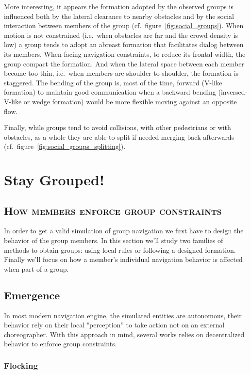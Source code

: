 \documentclass[a4paper,titlepage]{article}
\newcommand{\sectionsubtitle}[1]{{\subsection*{\scshape #1}}}
\begin{document}
More interesting, it appears the formation adopted by the observed groups is influenced both by the lateral clearance to nearby obstacles and by the social interaction between members of the group (cf.\ figure~\ref{fig:social_groups}). When motion is not constrained (i.e.\ when obstacles are far and the crowd density is low) a group tends to adopt an abreast formation that facilitates dialog between its members. When facing navigation constraints, to reduce its frontal width, the group compact the formation. And when the lateral space between each member become too thin, i.e.\ when members are shoulder-to-shoulder, the formation is staggered. The bending of the group is, most of the time, forward (V-like formation) to maintain good communication when a backward bending (inversed-V-like or wedge formation) would be more flexible moving against an opposite flow.

Finally, while groups tend to avoid collisions, with other pedestrians or with obstacles, as a whole they are able to split if needed merging back afterwards (cf.\ figure~\ref{fig:social_groups_splitting}).

\section{Stay Grouped!}
\label{sec:stay_grouped}
\sectionsubtitle{How members enforce group constraints}

In order to get a valid simulation of group navigation we first have to design the behavior of the group members. In this section we’ll study two families of methods to obtain groups: using local rules or following a designed formation. Finally we’ll focus on how a member’s individual navigation behavior is affected when part of a group.

\subsection{Emergence}
\label{sec:stay_grouped:emergence}

In most modern navigation engine, the simulated entities are autonomous, their behavior rely on their local "perception” to take action not on an external choreographer. With this approach in mind, several works relies on decentralized behavior to enforce group constraints.

\subsubsection{Flocking}
\end{document}
